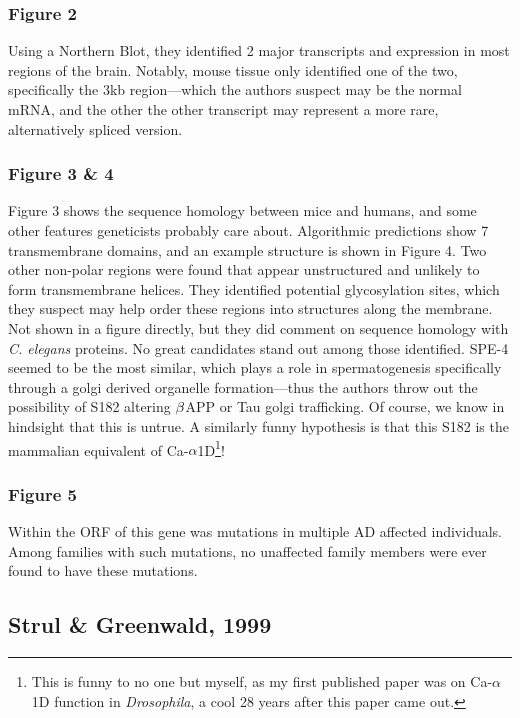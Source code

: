 \subsubsection*{Figure 2}

Using a Northern Blot, they identified 2 major transcripts and expression in most regions of the brain. Notably, mouse tissue only identified one of the two, specifically the 3kb region---which the authors suspect may be the normal mRNA, and the other the other transcript may represent a more rare, alternatively spliced version. 

\subsubsection*{Figure 3 \& 4}

Figure 3 shows the sequence homology between mice and humans, and some other features geneticists probably care about. Algorithmic predictions show 7 transmembrane domains, and an example structure is shown in Figure 4. Two other non-polar regions were found that appear unstructured and unlikely to form transmembrane helices. They identified potential glycosylation sites, which they suspect may help order these regions into structures along the membrane. Not shown in a figure directly, but they did comment on sequence homology with \textit{C. elegans} proteins. No great candidates stand out among those identified. SPE-4 seemed to be the most similar, which plays a role in spermatogenesis specifically through a golgi derived organelle formation---thus the authors throw out the possibility of S182 altering $\beta$APP or Tau golgi trafficking. Of course, we know in hindsight that this is untrue. A similarly funny hypothesis is that this S182 is the mammalian equivalent of Ca-$\alpha$1D\footnote{This is funny to no one but myself, as my first published paper was on Ca-$\alpha$1D function in \textit{Drosophila}, a cool 28 years after this paper came out.}! 

\subsubsection*{Figure 5}

Within the ORF of this gene was mutations in multiple AD affected individuals. Among families with such mutations, no unaffected family members were ever found to have these mutations. 

\subsection*{Strul \& Greenwald, 1999}

